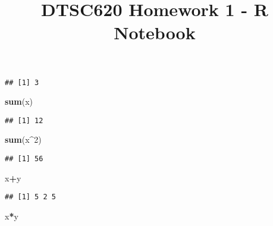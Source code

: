 \documentclass[
]{article}
\title{DTSC620 Homework 1 - R Notebook}
\author{}
\date{\vspace{-2.5em}}
\newenvironment{Shaded}{\begin{snugshade}}{\end{snugshade}}
\newcommand{\CommentTok}[1]{\textcolor[rgb]{0.56,0.35,0.01}{\textit{#1}}}
\newcommand{\DecValTok}[1]{\textcolor[rgb]{0.00,0.00,0.81}{#1}}
\newcommand{\KeywordTok}[1]{\textcolor[rgb]{0.13,0.29,0.53}{\textbf{#1}}}
\newcommand{\NormalTok}[1]{#1}
\newcommand{\OperatorTok}[1]{\textcolor[rgb]{0.81,0.36,0.00}{\textbf{#1}}}
\begin{document}
\maketitle

\begin{Shaded}
\end{Shaded}

\begin{verbatim}
## [1] 3
\end{verbatim}

\begin{Shaded}
\begin{Highlighting}[]
\KeywordTok{sum}\NormalTok{(x)}
\end{Highlighting}
\end{Shaded}

\begin{verbatim}
## [1] 12
\end{verbatim}

\begin{Shaded}
\begin{Highlighting}[]
\KeywordTok{sum}\NormalTok{(x}\OperatorTok{^}\DecValTok{2}\NormalTok{)}
\end{Highlighting}
\end{Shaded}

\begin{verbatim}
## [1] 56
\end{verbatim}

\begin{Shaded}
\begin{Highlighting}[]
\NormalTok{x}\OperatorTok{+}\NormalTok{y}
\end{Highlighting}
\end{Shaded}

\begin{verbatim}
## [1] 5 2 5
\end{verbatim}

\begin{Shaded}
\begin{Highlighting}[]
\NormalTok{x}\OperatorTok{*}\NormalTok{y}
\end{Highlighting}
\end{Shaded}
\end{document}
